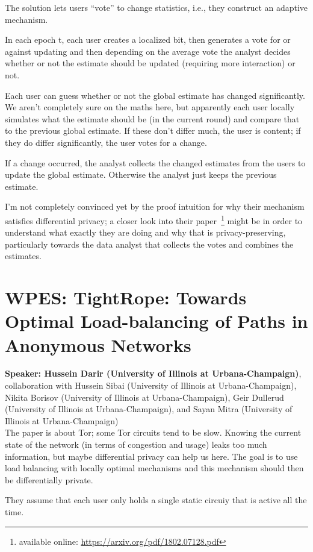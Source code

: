 \documentclass{article}
\begin{document}
The solution lets users “vote” to change statistics, i.e., they construct an adaptive mechanism.


In each epoch t, each user creates a localized bit, then generates a vote for or against updating and then depending on the average vote the analyst decides whether or not the estimate should be updated (requiring more interaction) or not.

Each user can guess whether or not the global estimate has changed significantly. We aren’t completely sure on the maths here, but apparently each user locally simulates what the estimate should be (in the current round) and compare that to the previous global estimate. If these don’t differ much, the user is content; if they do differ significantly, the user votes for a change.

If a change occurred, the analyst collects the changed estimates from the users to update the global estimate. Otherwise the analyst just keeps the previous estimate.

I’m not completely convinced yet by the proof intuition for why their mechanism satisfies differential privacy; a closer look into their paper~\footnote{available online: \url{https://arxiv.org/pdf/1802.07128.pdf}} might be in order to understand what exactly they are doing and why that is privacy-preserving, particularly towards the data analyst that collects the votes and combines the estimates.


\section{WPES: TightRope: Towards Optimal Load-balancing of Paths in Anonymous Networks}
\noindent\textbf{Speaker: Hussein Darir (University of Illinois at Urbana-Champaign)}, collaboration with Hussein Sibai (University of Illinois at Urbana-Champaign), Nikita Borisov (University of Illinois at Urbana-Champaign), Geir Dullerud (University of Illinois at Urbana-Champaign), and Sayan Mitra (University of Illinois at Urbana-Champaign)\\

The paper is about Tor; some Tor circuits tend to be slow. Knowing the current state of the network (in terms of congestion and usage) leaks too much information, but maybe differential privacy can help us here. The goal is to use load balancing with locally optimal mechanisms and this mechanism should then be differentially private.

They assume that each user only holds a single static circuiy that is active all the time. 
\end{document}
